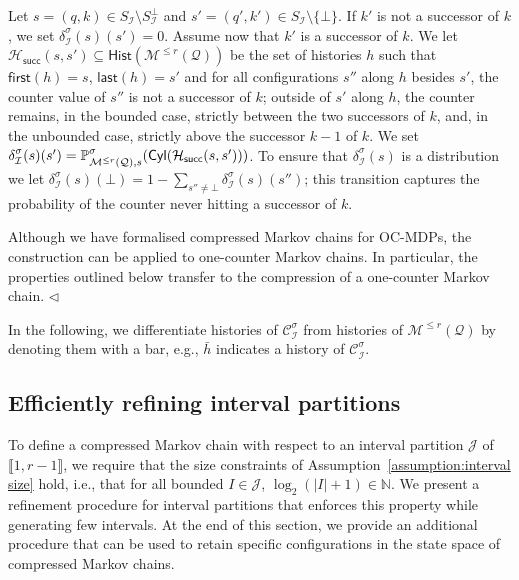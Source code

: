 \documentclass[a4paper,UKenglish,cleveref,autoref,thm-restate,colorlinks]{lipics-v2021}
\newcommand{\integerInterval}[1]{\llbracket{}#1\rrbracket{}}
\newcommand{\IN}{\mathbb{N}}
\newcommand{\cyl}[1]{\mathsf{Cyl}(#1)}
\newcommand{\mdp}{\mathcal{M}}
\newcommand{\mdpStateSpace}{S}
\newcommand{\mdpTrans}{\delta}
\newcommand{\histSet}[1]{\mathsf{Hist}(#1)}
\newcommand{\histPart}{\mathcal{H}}
\newcommand{\hist}{h}
\newcommand{\last}[1]{\mathsf{last}(#1)}
\newcommand{\first}[1]{\mathsf{first}(#1)}
\newcommand{\ocmdp}{\mathcal{Q}}
\newcommand{\ocmdpFin}[2]{\mdp^{\leq #2}(#1)}
\newcommand{\ocState}{q}
\newcommand{\ocCount}{k}
\newcommand{\ocConfig}{s}
\newcommand{\counterUB}{r}
\newcommand{\mchain}{\mathcal{C}}
\newcommand{\intPart}{\mathcal{I}}
\newcommand{\intPartB}{\mathcal{J}}
\newcommand{\interval}{I}
\newcommand{\compressChainStrat}[1]{\mchain^{#1}_{\intPart}}
\newcommand{\compressChain}{\compressChainStrat{\strat}}
\newcommand{\compressChainStateSpace}{\mdpStateSpace_{\intPart}}
\newcommand{\compressChainStateSpaceStar}{\mdpStateSpace_{\intPart}^{\bot}}
\newcommand{\compressChainTransTemplate}[2]{\mdpTrans^{#1}_{#2}}
\newcommand{\compressChainTrans}{\compressChainTransTemplate{\strat}{\intPart}}
\newcommand{\succHist}[2]{\histPart_{\mathsf{succ}}(#1, #2)}
\newcommand{\mcHist}{\bar{\hist}}
\newcommand{\stratGeneric}[1]{{\sigma_{#1}}}
\newcommand{\strat}{\stratGeneric{}}
\begin{document}
Let $\ocConfig = (\ocState, \ocCount)\in\compressChainStateSpace\setminus\compressChainStateSpaceStar$ and $\ocConfig' = (\ocState', \ocCount')\in\compressChainStateSpace\setminus\{\bot\}$.
If $\ocCount'$ is not a successor of $\ocCount$, we set $\compressChainTrans(\ocConfig)(\ocConfig') = 0$.
Assume now that $\ocCount'$ is a successor of $\ocCount$.
We let $\succHist{\ocConfig}{\ocConfig'}\subseteq\histSet{\ocmdpFin{\ocmdp}{\counterUB}}$ be the set of histories $\hist$ such that $\first{\hist} = \ocConfig$, $\last{\hist}=\ocConfig'$ and for all configurations $\ocConfig''$ along $\hist$ besides $\ocConfig'$, the counter value of $\ocConfig''$ is not a successor of $\ocCount$; outside of $\ocConfig'$ along $\hist$, the counter remains, in the bounded case, strictly between the two successors of $\ocCount$, and, in the unbounded case, strictly above the successor $\ocCount-1$ of $\ocCount$.
We set $\compressChainTrans(\ocConfig)(\ocConfig') = \probaGverb{\ocmdpFin{\ocmdp}{\counterUB}}{\ocConfig}{\strat}(\cyl{\succHist{\ocConfig}{\ocConfig'}})$.
To ensure that $\compressChainTrans(\ocConfig)$ is a distribution we let $\compressChainTrans(\ocConfig)(\bot) = 1 - \sum_{\ocConfig''\neq\bot}\compressChainTrans(\ocConfig)(\ocConfig'')$; this transition captures the probability of the counter never hitting a successor of $\ocCount$.


\begin{remark}\label{remark:compressing ocmcs}
  Although we have formalised compressed Markov chains for OC-MDPs, the construction can be applied to one-counter Markov chains.
  In particular, the properties outlined below transfer to the compression of a one-counter Markov chain.
  \hfill$\lhd$
\end{remark}

In the following, we differentiate histories of $\compressChain$ from histories of $\ocmdpFin{\ocmdp}{\counterUB}$ by denoting them with a bar, e.g., $\mcHist$ indicates a history of $\compressChain$.

\subsection{Efficiently refining interval partitions}\label{section:compression:refinement}
To define a compressed Markov chain with respect to an interval partition $\intPartB$ of $\integerInterval{1, \counterUB-1}$, we require that the size constraints of Assumption~\ref{assumption:interval size} hold, i.e., that for all bounded $\interval\in\intPartB$, $\log_2(|\interval|+1)\in\IN$.
We present a refinement procedure for interval partitions that enforces this property while generating few intervals.
At the end of this section, we provide an additional procedure that can be used to retain specific configurations in the state space of compressed Markov chains.
\end{document}
